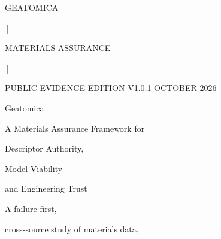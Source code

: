 \documentclass[11pt,a4paper,oneside]{report}
\begin{document}
\begin{titlepage}



\thispagestyle{empty}



\begin{center}



\vspace*{0.8cm}



{\small

\bfseries

\color{geoGold}

GEATOMICA

\,|\,

MATERIALS ASSURANCE

\,|\,

    PUBLIC EVIDENCE EDITION V1.0.1 \textbar{} OCTOBER 2026

\par}



\vspace{0.85cm}



{\Huge

\bfseries

\color{geoBlue}

Geatomica

\par}



\vspace{0.22cm}



{\LARGE

\bfseries

\color{geoDark}

A Materials Assurance Framework for

Descriptor Authority,

Model Viability

and Engineering Trust

\par}



\vspace{0.55cm}



{\large

A failure-first,

cross-source study of materials data,

}
\end{center}
\end{titlepage}
\end{document}
